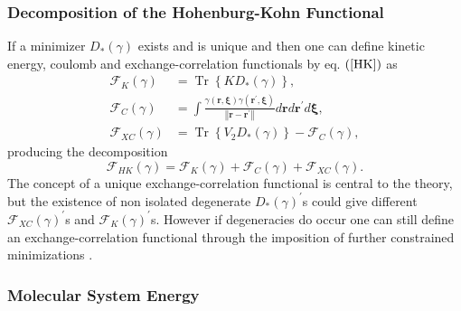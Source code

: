 \documentclass[aps,preprint]{revtex4}%
\begin{document}
\subsubsection{Decomposition of the Hohenburg-Kohn Functional}

If a minimizer $D_{\ast}\left(  \gamma\right)  $ exists and is unique and then
one can define kinetic energy, coulomb and exchange-correlation functionals by
eq. $\left(  \ref{HK}\right)  $ as
\begin{align}
\mathcal{F}_{K}\left(  \gamma\right)   &  =\operatorname{Tr}\left\{  KD_{\ast
}\left(  \gamma\right)  \right\}  ,\nonumber\\
\mathcal{F}_{C}\left(  \gamma\right)   &  =\int\frac{\gamma\left(
\boldsymbol{r,\xi}\right)  \gamma\left(  \boldsymbol{r}^{\prime}%
\boldsymbol{,\xi}\right)  }{\left\Vert \boldsymbol{r-r}^{\prime}\right\Vert
}d\boldsymbol{r}d\boldsymbol{r}^{\prime}d\boldsymbol{\xi},\nonumber\\
\mathcal{F}_{XC}\left(  \gamma\right)   &  =\operatorname{Tr}\left\{
V_{2}D_{\ast}\left(  \gamma\right)  \right\}  -\mathcal{F}_{C}\left(
\gamma\right)  ,
\end{align}
producing the decomposition
\begin{equation}
\mathcal{F}_{HK}\left(  \gamma\right)  =\mathcal{F}_{K}\left(  \gamma\right)
+\mathcal{F}_{C}\left(  \gamma\right)  +\mathcal{F}_{XC}\left(  \gamma\right)
.
\end{equation}
The concept of a unique exchange-correlation functional is central to the
theory, but the existence of non isolated degenerate $D_{\ast}\left(
\gamma\right)  ^{\prime}$s could give different $\mathcal{F}_{XC}\left(
\gamma\right)  ^{\prime}$s and $\mathcal{F}_{K}\left(  \gamma\right)
^{\prime}$s. However if degeneracies do occur one can still define an
exchange-correlation functional through the imposition of further constrained
minimizations \cite{weiner06}.

\subsubsection{Molecular System Energy}
\end{document}
